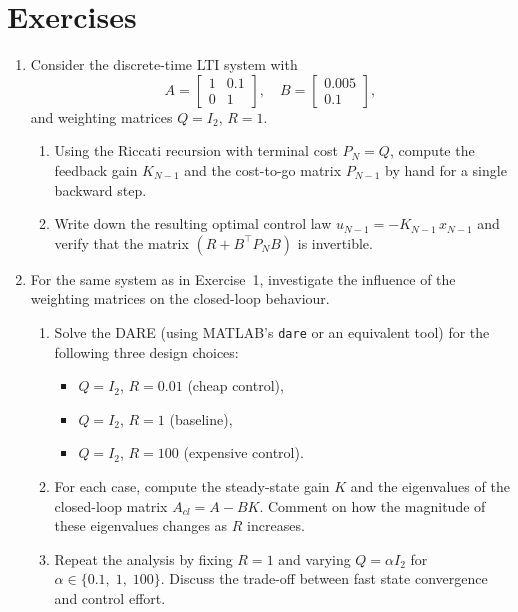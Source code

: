 \section*{Exercises}
\begin{enumerate}
	\item Consider the discrete-time LTI system with
	\[
	A = \begin{bmatrix} 1 & 0.1 \\ 0 & 1 \end{bmatrix}, \quad B = \begin{bmatrix} 0.005 \\ 0.1 \end{bmatrix},
	\]
	and weighting matrices $Q = I_2$, $R = 1$.
	\begin{enumerate}
		\item Using the Riccati recursion with terminal cost $P_N = Q$, compute the feedback gain $K_{N-1}$ and the cost-to-go matrix $P_{N-1}$ by hand for a single backward step.
		\item Write down the resulting optimal control law $u_{N-1} = -K_{N-1}\,x_{N-1}$ and verify that the matrix $(R + B^\top P_N B)$ is invertible.
	\end{enumerate}

	\item For the same system as in Exercise~1, investigate the influence of the weighting matrices on the closed-loop behaviour.
	\begin{enumerate}
		\item Solve the DARE (using MATLAB's \texttt{dare} or an equivalent tool) for the following three design choices:
		\begin{itemize}
			\item $Q = I_2$, $R = 0.01$ \quad (cheap control),
			\item $Q = I_2$, $R = 1$ \quad (baseline),
			\item $Q = I_2$, $R = 100$ \quad (expensive control).
		\end{itemize}
		\item For each case, compute the steady-state gain $K$ and the eigenvalues of the closed-loop matrix $A_{cl} = A - BK$. Comment on how the magnitude of these eigenvalues changes as $R$ increases.
		\item Repeat the analysis by fixing $R = 1$ and varying $Q = \alpha I_2$ for $\alpha \in \{0.1,\; 1,\; 100\}$. Discuss the trade-off between fast state convergence and control effort.
	\end{enumerate}


\end{enumerate}
